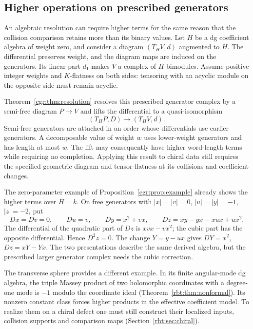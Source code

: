 \subsection{Higher operations on prescribed generators}

An\label{e1f:def:prescribed-generator-diagram} algebraic resolution can require higher terms for the
same reason that the collision comparison retains more
than its binary values. Let \(H\) be a dg coefficient
algebra of weight zero, and consider a diagram
\((T_HV,d)\) augmented to \(H\). The differential preserves
weight, and the diagram maps are induced on the generators.
Its linear part \(d_1\) makes \(V\) a complex of
\(H\)-bimodules. Assume positive integer weights and
\(K\)-flatness on both sides: tensoring with an acyclic
module on the opposite side must remain acyclic.

Theorem~\ref{cgr:thm:resolution} resolves this prescribed
generator complex by a semi-free diagram \(P\to V\)
and lifts the differential to a quasi-isomorphism
\[
 (T_HP,D)\longrightarrow(T_HV,d).
\]
Semi-free generators are attached in an order whose
differentials use earlier generators. A decomposable value
of weight \(w\) uses lower-weight generators and has
length at most \(w\). The lift may consequently have
higher word-length terms while requiring no completion.
Applying this result to chiral data still requires the
specified geometric diagram and tensor-flatness at its
collisions and coefficient changes.

The\label{e1f:def:higher-generator-differential} zero-parameter example of Proposition~\ref{cgr:prop:example}
already shows the higher terms over \(H=k\). On free
generators with \(|x|=|v|=0\), \(|u|=|y|=-1\),
\(|z|=-2\), put
\[
 Dx=Dv=0,\qquad Du=v,\qquad Dy=x^2+vx,
 \qquad Dz=xy-yx-xux+ux^2.
\]
The differential of the quadratic part of \(Dz\) is
\(xvx-vx^2\); the cubic part has the opposite differential.
Hence \(D^2z=0\). The change \(Y=y-ux\) gives
\(DY=x^2\), \(Dz=xY-Yx\). The two presentations describe
the same derived algebra, but the prescribed larger
generator complex needs the cubic correction.

The transverse sphere provides a different example.
In its finite angular-mode dg algebra, the triple Massey
product of two holomorphic coordinates with a degree-one
mode is \(-1\) modulo the coordinate ideal
(Theorem~\ref{rbt:thm:nonformal}). Its nonzero constant
class forces higher products in the effective coefficient
model. To realize them on a chiral defect one must still
construct their localized inputs, collision supports and
comparison maps (Section~\ref{rbt:sec:chiral}).


